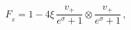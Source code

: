 \begin{equation}\label{boro227}
F_{_{\!S}}=1-4\xi\,\frac {v_{+}^{}}{e^{\sigma}+1}\otimes
\frac{v_{+}^{}}{e^{\sigma}+1}\,,
\end{equation}

